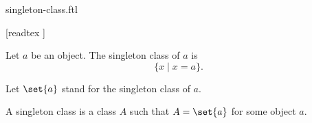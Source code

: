 \documentclass{stex}
\begin{document}
\begin{smodule}{singleton-class.ftl}

  \begin{forthel}

    [readtex ]
  \end{forthel}

  \begin{forthel}
    \begin{definition}
      Let $a$ be an object.
      The singleton class of $a$ is \[ \{ x \mid x = a \}. \]
    \end{definition}

    Let $\set{a}$ stand for the singleton class of $a$.
  \end{forthel}

  \begin{forthel}
    \begin{definition}
      A singleton class is a class $A$ such that $A = \set{a}$ for some object $a$.
    \end{definition}
  \end{forthel}
\end{smodule}
\end{document}
